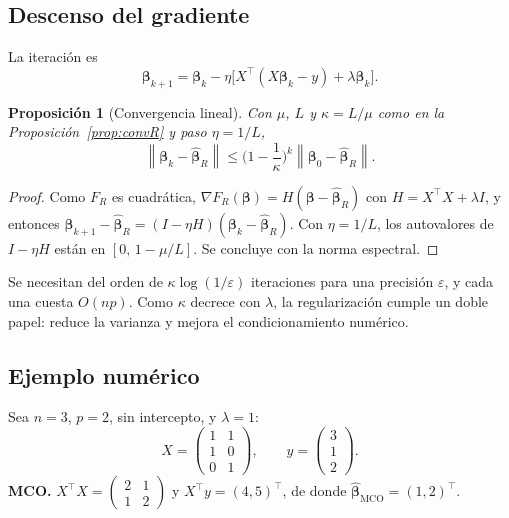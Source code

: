 \documentclass[11pt,a4paper]{article}
\newcommand{\norm}[1]{\left\lVert #1 \right\rVert}
\newcommand{\bt}{\bm{\beta}}
\newcommand{\bh}{\hat{\bm{\beta}}}
\theoremstyle{simple}
\newtheorem{proposicion}{Proposición}[section]
\begin{document}
\subsection{Descenso del gradiente}
La iteración es
\begin{equation}\label{eq:gd}
\bt_{k+1}=\bt_k-\eta\big[X^\top(X\bt_k-y)+\lambda\bt_k\big].
\end{equation}
\begin{proposicion}[Convergencia lineal]\label{prop:gd}
Con $\mu$, $L$ y $\kappa=L/\mu$ como en la Proposición~\ref{prop:convR} y paso $\eta=1/L$,
\[
\norm{\bt_k-\bh_R}\le\Big(1-\frac1\kappa\Big)^{k}\norm{\bt_0-\bh_R}.
\]
\end{proposicion}
\begin{proof}
Como $F_R$ es cuadrática, $\nabla F_R(\bt)=H(\bt-\bh_R)$ con $H=X^\top X+\lambda I$, y entonces $\bt_{k+1}-\bh_R=(I-\eta H)(\bt_k-\bh_R)$. Con $\eta=1/L$, los autovalores de $I-\eta H$ están en $[0,\,1-\mu/L]$. Se concluye con la norma espectral.
\end{proof}
Se necesitan del orden de $\kappa\log(1/\varepsilon)$ iteraciones para una precisión $\varepsilon$, y cada una cuesta $O(np)$. Como $\kappa$ decrece con $\lambda$, la regularización cumple un doble papel: reduce la varianza y mejora el condicionamiento numérico.

\subsection{Ejemplo numérico}
Sea $n=3$, $p=2$, sin intercepto, y $\lambda=1$:
\[
X=\begin{pmatrix}1&1\\1&0\\0&1\end{pmatrix},\qquad y=\begin{pmatrix}3\\1\\2\end{pmatrix}.
\]
\textbf{MCO.} $X^\top X=\begin{pmatrix}2&1\\1&2\end{pmatrix}$ y $X^\top y=(4,5)^\top$, de donde $\bh_{\mathrm{MCO}}=(1,2)^\top$.
\end{document}
